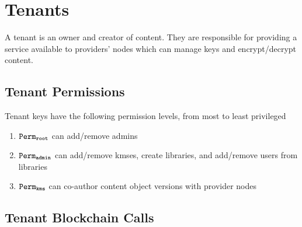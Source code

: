 \section{Tenants}

A tenant is an owner and creator of content. They are responsible for providing a service available to providers' nodes which can manage keys and encrypt/decrypt content.


\subsection{Tenant Permissions}
Tenant keys have the following permission levels, from most to least privileged

\begin{enumerate}
  \item $\mathtt{Perm_{root}}$ can add/remove admins
  \item $\mathtt{Perm_{admin}}$ can add/remove kmses, create libraries, and add/remove users from libraries
  \item $\mathtt{Perm_{kms}}$ can co-author content object versions with provider nodes
\end{enumerate}

\subsection{Tenant Blockchain Calls}

